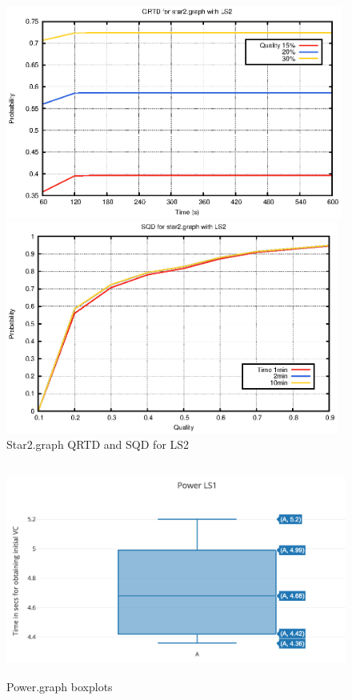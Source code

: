 \begin{figure}[H]
\centering
\caption{Star2.graph QRTD and SQD for LS2}
\begin{minipage}[b]{0.4\textwidth}
\includegraphics[height=7cm]{../graph/star2-QRTD-LS2.eps}
\end{minipage}
\hspace{0.6in}
\begin{minipage}[b]{0.4\textwidth}
\centering
\includegraphics[height=7cm]{../graph/star2-SQD-LS2.eps}
\end{minipage}
\end{figure}

\begin{figure}[H]
\centering
\caption{Power.graph boxplots}
\includegraphics[height=7cm]{../graph/powerls1}
\end{figure}

